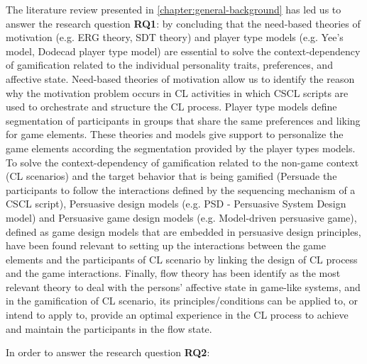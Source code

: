The literature review presented in \autoref{chapter:general-background} has led us to answer the research question \textbf{RQ1}: 
 by concluding that the need-based theories of motivation (e.g. ERG theory, SDT theory) and player type models (e.g. Yee's model, Dodecad player type model) are essential to solve the context-dependency of gamification related to the individual personality traits, preferences, and affective state. Need-based theories of motivation allow us to identify the reason why the motivation problem occurs in CL activities in which CSCL scripts are used to orchestrate and structure the CL process. Player type models define segmentation of participants in groups that share the same preferences and liking for game elements. These theories and models give support to personalize the game elements according the segmentation provided by the player types models. To solve the context-dependency of gamification related to the non-game context (CL scenarios) and the target behavior that is being gamified (Persuade the participants to follow the interactions defined by the sequencing mechanism of a CSCL script), Persuasive design models (e.g. PSD - Persuasive System Design model) and Persuasive game design models (e.g. Model-driven persuasive game), defined as game design models that are embedded in persuasive design principles, have been found relevant to setting up the interactions between the game elements and the participants of CL scenario by linking the design of CL process and the game interactions. Finally, flow theory has been identify as the most relevant theory to deal with the persons' affective state in game-like systems, and in the gamification of CL scenario, its principles/conditions can be applied to, or intend to apply to, provide an optimal experience in the CL process to achieve and maintain the participants in the flow state.

In order to answer the research question \textbf{RQ2}: 

